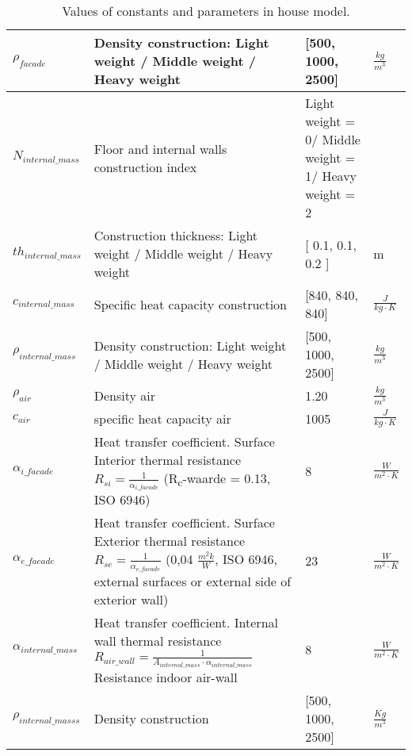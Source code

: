 \begin{table}[H]
\begin{tabular}{|p{3cm}||p{7cm}||p{3cm}||p{3cm}|}
 $\rho_{facade}$& Density construction: Light weight / Middle weight / Heavy weight  & [500, 1000, 2500] &$\frac{kg}{m^3}$\\
 \hline
 

 $N_{internal{\_}mass}$& Floor and internal walls construction index  & Light weight = 0/ Middle weight = 1/ Heavy weight = 2 &\\
 \hline
 
 $th_{internal{\_}mass}$& Construction thickness: Light weight / Middle weight / Heavy weight & [ 0.1,  0.1, 0.2 ] & m \\
 \hline
 
 $c_{internal{\_}mass}$& Specific heat capacity construction & [840, 840, 840] &$\frac{J}{kg \cdot K}$\\
 \hline
 
 $\rho_{internal{\_}mass}$& Density construction: Light weight / Middle weight / Heavy weight  & [500, 1000, 2500] &$\frac{kg}{m^3}$\\
 \hline
 
 $\rho_{air}$& Density air & 1.20 &$\frac{kg}{m^3}$\\
 \hline
  
 $c_{air}$& specific heat capacity air  & 1005 &$\frac{J}{kg \cdot K}$\\
 \hline
 
 $\alpha_{i{\_}facade}$ & Heat transfer coefficient. Surface Interior thermal resistance $R_{si} =\frac{1}{\alpha_{i{\_}facade}}$  (R\textsubscript{c}-waarde = 0.13, ISO 6946) & 8 & $\frac{W}{m^2 \cdot K}$ \\
\hline
 
 $\alpha_{e{\_}facade}$ & Heat transfer coefficient. Surface Exterior thermal resistance $R_{se} =\frac{1}{\alpha_{e{\_}facade}}$ (0,04 $\frac{m^2k}{W}$, ISO 6946, external surfaces or external side of exterior wall) & 23 &$\frac{W}{m^2 \cdot K}$\\
\hline
 
$\alpha_{internal{\_}mass}$& Heat transfer coefficient. Internal wall thermal resistance $ R_{air{\_}wall} =\frac{1}{A_{internal{\_}mass} \cdot \alpha_{internal{\_}mass}} $ Resistance indoor air-wall  & 8 &$\frac{W}{m^2 \cdot K}$\\
\hline
 
 $\rho_{internal{\_}masss}$& Density construction & [500, 1000, 2500] & $\frac{Kg}{m^3}$\\
\hline

\end{tabular}

\caption{Values of constants and parameters in house model.}
\label{tab:Paramteres}
\end{table}

